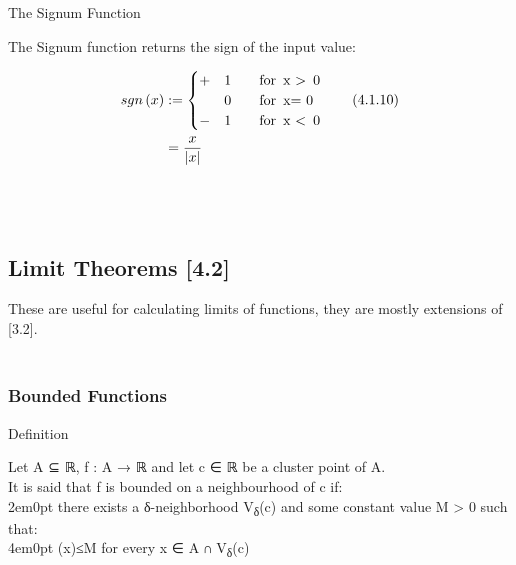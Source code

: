 The Signum Function\protect\hypertarget{the-signum-function}{}{}

The Signum function returns the sign of the input value:

\[\begin{aligned} sgn\left( x
\right) &:= \begin{cases} +&1
\qquad \text{for}
\enspace $x \textgreater
\enspace 0$ \\ &0
\qquad \text{for}
\enspace $x= 0$ \\ -&1
\qquad \text{for}
\enspace $x \textless
\enspace 0$ \end{cases}
\tag{4.1.10} \label{4110}
\\ &=
\frac{x}{\lvert x
\rvert}
\notag\end{aligned}\]\\

\hypertarget{limit-theorems-4.2}{%
\subsection[\hfill\break
Limit Theorems
{[}4.2{]}]{\texorpdfstring{\protect\hypertarget{SECTION00012000000000000000}{}{}\protect\hypertarget{limit-theorems-4.2}{}{}~\\
Limit Theorems
{[}4.2{]}}{ Limit Theorems {[}4.2{]}}}\label{limit-theorems-4.2}}

These are useful for calculating limits of functions, they are mostly
extensions of {[}3.2{]}.

\hypertarget{bounded-functions}{%
\subsubsection[\hfill\break
Bounded
Functions]{\texorpdfstring{\protect\hypertarget{SECTION00012100000000000000}{}{}\protect\hypertarget{bounded-functions}{}{}~\\
Bounded Functions}{ Bounded Functions}}\label{bounded-functions}}

Definition\protect\hypertarget{definition-1}{}{}

Let {A} ⊆ ℝ, {f} : {A} → ℝ and let {c} ∈ ℝ be a cluster point of {A}.\\
It is said that {f is bounded on a neighbourhood of} {c} if:\\

2em0pt there exists a {δ}-neighborhood {V}\textsubscript{{δ}}({c}) and
some constant value {M} \textgreater{} 0 such that:\\

4em0pt ({x})\textbar≤{M} for every
{x} ∈ {A} ∩ {V}\textsubscript{{δ}}({c})


